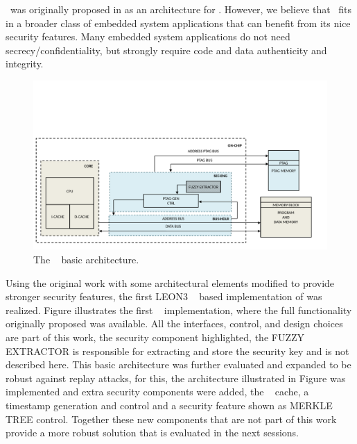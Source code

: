 \cshia~was originally proposed in \cite{Hoffman2015} as an architecture for \iot. However, we believe that \cshia~fits in a broader class of embedded system applications that can benefit from its nice security features. Many embedded system applications do not need secrecy\slash{}confidentiality, but strongly require code and data authenticity and integrity. 
\begin{figure}[!ht]
    \centering
    \includegraphics[width=\textwidth]{figures/pdf/CSHIA_basic.pdf}
    \caption{The \cshia~ basic architecture.}
    \label{fig:cshia}
\end{figure}
Using the original work with some architectural elements modified to provide stronger security features, the first LEON3 \fpga~ based implementation of \cshia was realized. Figure \label{fig:cshia} illustrates the first \cshia~ implementation, where the full functionality originally proposed was available. All the interfaces, control, and design choices are part of this work, the security component highlighted, the FUZZY EXTRACTOR  is responsible for extracting and store the security key and is not described here.  This basic architecture was further evaluated and expanded to be robust against replay attacks, for this,  the architecture illustrated in Figure \label{fig:cshiaexpanded} was implemented and extra security components were added, the \ptag~ cache, a timestamp generation and control and a security feature shown as MERKLE TREE control. Together these new components that are not part of this work provide a more robust solution that is evaluated in the next sessions.



